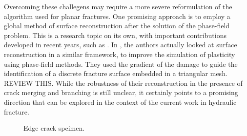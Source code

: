 Overcoming these challegens may require a more severe reformulation of the algorithm used for planar fractures. One promising approach is to employ a global method of surface reconstruction after the solution of the phase-field problem. This is a research topic on its own, with important contributions developed in recent years, such as \cite{}. In \cite{}, the authors actually looked at surface reconstruction in a similar framework, to improve the simulation of plasticity using phase-field methods. They used the gradient of the damage to guide the identification of a discrete fracture surface embedded in a triangular mesh. REVIEW THIS. While the robustness of their reconstruction in the presence of crack merging and branching is still unclear, it certainly points to a promising direction that can be explored in the context of the current work in hydraulic fracture.

\begin{figure}[ht]
    \centering
    \caption{Edge crack spcimen.}
    \label{fig:nonplanar_schematic}
\end{figure}

